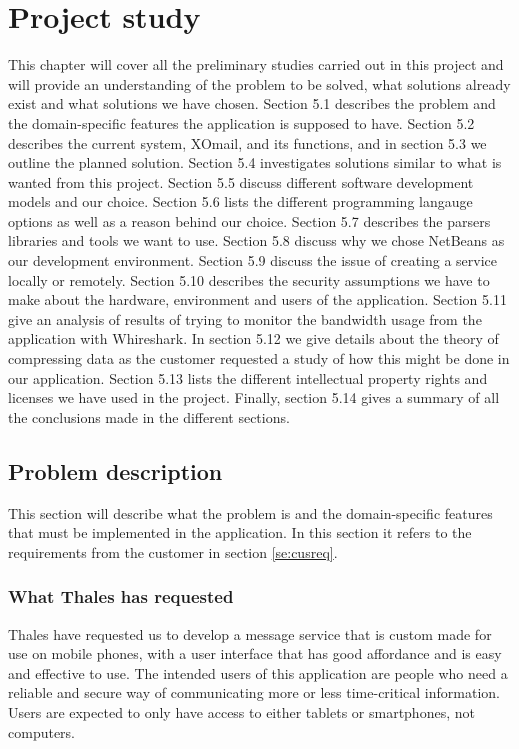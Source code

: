 \chapter{Project study}

This chapter will cover all the preliminary studies carried out in this project and will provide an understanding of the problem to be solved, what solutions already exist and what solutions we have chosen. Section 5.1 describes the problem and the domain-specific features the application is supposed to have. Section 5.2 describes the current system, XOmail, and its functions, and in section 5.3 we outline the planned solution. Section 5.4 investigates solutions similar to what is wanted from this project. Section 5.5 discuss different software development models and our choice. Section 5.6 lists the different programming langauge options as well as a reason behind our choice. Section 5.7 describes the parsers libraries and tools we want to use. Section 5.8 discuss why we chose NetBeans as our development environment. Section 5.9 discuss the issue of creating a service locally or remotely. Section 5.10 describes the security assumptions we have to make about the hardware, environment and users of the application. Section 5.11 give an analysis of results of trying to monitor the bandwidth usage from the application with Whireshark. In section 5.12 we  give details about the theory of compressing data as the customer requested a study of how this might be done in our application. Section 5.13 lists the different intellectual property rights and licenses we have used in the project. Finally, section 5.14 gives a summary of all the conclusions made in the different sections.

\section{Problem description}

This section will describe what the problem is and the domain-specific features that must be implemented in the application. In this section it refers to the requirements from the customer in section \ref{se:cusreq}.

\subsection{What Thales has requested}
Thales have requested us to develop a message service that is custom made for use on mobile phones, with a user interface that has good affordance and is easy and effective to use.
\newline
\newline
The intended users of this application are people who need a reliable and secure way of communicating more or less time-critical information. Users are expected to only have access to either tablets or smartphones, not computers.

